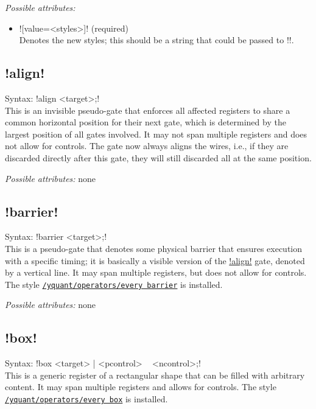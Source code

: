 \documentclass{scrartcl}
\def\style#1{\hyperref[style:#1]{\texttt{#1}}}
\begin{document}
         \emph{Possible attributes:}
         \begin{itemize}
            \item \yquant![value=<styles>]! (required) \\
               Denotes the new styles; this should be a string that could be passed to \tex!\tikzset!.
         \end{itemize}

      \subsection{\texorpdfstring{\yquant!align!}{align}}\label{gate:align}
         Syntax: \yquant!align <target>;! \\
         This is an invisible pseudo\hyp gate that enforces all affected registers to share a common horizontal position for their next gate, which is determined by the largest position of all gates involved.
         It may not span multiple registers and does not allow for controls.
         The gate now always aligns the wires, i.e., if they are discarded directly after this gate, they will still discarded all at the same position.

         \emph{Possible attributes:} none

      \subsection{\texorpdfstring{\yquant!barrier!}{barrier}}\label{gate:barrier}
         Syntax: \yquant!barrier <target>;! \\
         This is a pseudo\hyp gate that denotes some physical barrier that ensures execution with a specific timing; it is basically a visible version of the \hyperref[gate:align]{\yquant!align!} gate, denoted by a vertical line.
         It may span multiple registers, but does not allow for controls.
         The style \style{/yquant/operators/every barrier} is installed.

         \emph{Possible attributes:} none

      \subsection{\texorpdfstring{\yquant!box!}{box}}\label{gate:box}
         Syntax: \yquant!box <target> | <pcontrol> ~ <ncontrol>;! \\
         This is a generic register of a rectangular shape that can be filled with arbitrary content.
         It may span multiple registers and allows for controls.
         The style \style{/yquant/operators/every box} is installed.
\end{document}
